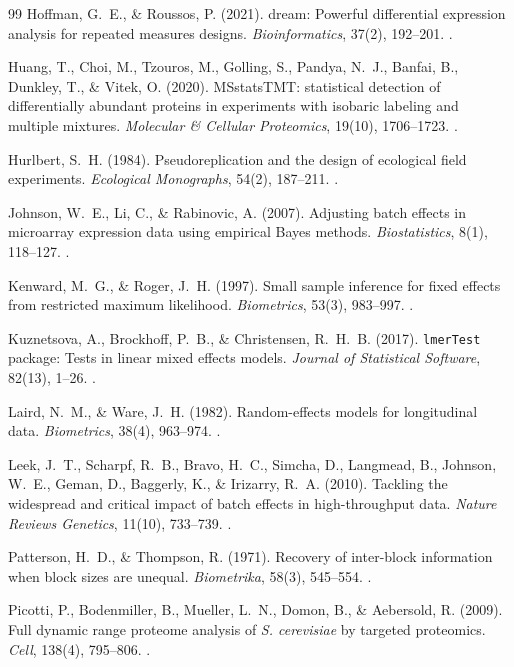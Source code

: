 \documentclass[11pt,twoside,openright]{book}
\begin{document}
\begin{thebibliography}{99}
Hoffman, G.~E., \& Roussos, P. (2021). dream: Powerful differential expression analysis for repeated measures designs. \textit{Bioinformatics}, 37(2), 192--201. .

Huang, T., Choi, M., Tzouros, M., Golling, S., Pandya, N.~J., Banfai, B., Dunkley, T., \& Vitek, O. (2020). MSstatsTMT: statistical detection of differentially abundant proteins in experiments with isobaric labeling and multiple mixtures. \textit{Molecular \& Cellular Proteomics}, 19(10), 1706--1723. .

Hurlbert, S.~H. (1984). Pseudoreplication and the design of ecological field experiments. \textit{Ecological Monographs}, 54(2), 187--211. .

Johnson, W.~E., Li, C., \& Rabinovic, A. (2007). Adjusting batch effects in microarray expression data using empirical Bayes methods. \textit{Biostatistics}, 8(1), 118--127. .

Kenward, M.~G., \& Roger, J.~H. (1997). Small sample inference for fixed effects from restricted maximum likelihood. \textit{Biometrics}, 53(3), 983--997. .

Kuznetsova, A., Brockhoff, P.~B., \& Christensen, R.~H.~B. (2017). \texttt{lmerTest} package: Tests in linear mixed effects models. \textit{Journal of Statistical Software}, 82(13), 1--26. .

Laird, N.~M., \& Ware, J.~H. (1982). Random-effects models for longitudinal data. \textit{Biometrics}, 38(4), 963--974. .

Leek, J.~T., Scharpf, R.~B., Bravo, H.~C., Simcha, D., Langmead, B., Johnson, W.~E., Geman, D., Baggerly, K., \& Irizarry, R.~A. (2010). Tackling the widespread and critical impact of batch effects in high-throughput data. \textit{Nature Reviews Genetics}, 11(10), 733--739. .

Patterson, H.~D., \& Thompson, R. (1971). Recovery of inter-block information when block sizes are unequal. \textit{Biometrika}, 58(3), 545--554. .

Picotti, P., Bodenmiller, B., Mueller, L.~N., Domon, B., \& Aebersold, R. (2009). Full dynamic range proteome analysis of \textit{S. cerevisiae} by targeted proteomics. \textit{Cell}, 138(4), 795--806. .


\end{thebibliography}
\end{document}
